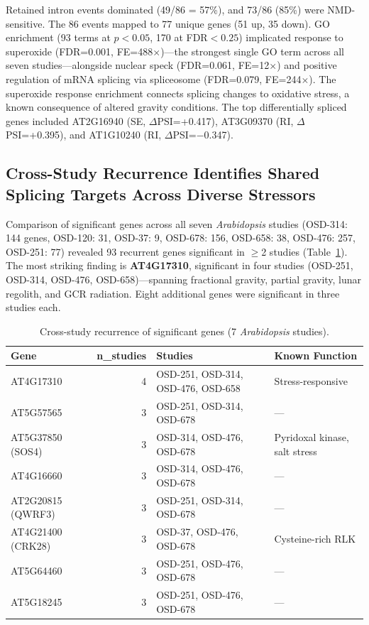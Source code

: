 \documentclass[12pt,a4paper]{article}
\begin{document}
Retained intron events dominated (49/86 = 57\%), and 73/86 (85\%) were NMD-sensitive. The 86 events mapped to 77 unique genes (51 up, 35 down). GO enrichment (93 terms at $p<0.05$, 170 at FDR$<0.25$) implicated response to superoxide (FDR=0.001, FE=488$\times$)---the strongest single GO term across all seven studies---alongside nuclear speck (FDR=0.061, FE=12$\times$) and positive regulation of mRNA splicing via spliceosome (FDR=0.079, FE=244$\times$). The superoxide response enrichment connects splicing changes to oxidative stress, a known consequence of altered gravity conditions. The top differentially spliced genes included AT2G16940 (SE, $\Delta$PSI=+0.417), AT3G09370 (RI, $\Delta$PSI=+0.395), and AT1G10240 (RI, $\Delta$PSI=$-$0.347).

\subsection{Cross-Study Recurrence Identifies Shared Splicing Targets Across Diverse Stressors}

Comparison of significant genes across all seven \textit{Arabidopsis} studies (OSD-314: 144 genes, OSD-120: 31, OSD-37: 9, OSD-678: 156, OSD-658: 38, OSD-476: 257, OSD-251: 77) revealed 93 recurrent genes significant in $\geq$2 studies (Table~\ref{tab:cross_study_recurrence}). The most striking finding is \textbf{AT4G17310}, significant in four studies (OSD-251, OSD-314, OSD-476, OSD-658)---spanning fractional gravity, partial gravity, lunar regolith, and GCR radiation. Eight additional genes were significant in three studies each.

\begin{table}[h]
\centering
\caption{Cross-study recurrence of significant genes (7 \textit{Arabidopsis} studies).}
\label{tab:cross_study_recurrence}
\begin{tabular}{lrll}
\toprule
\textbf{Gene} & \textbf{n\_studies} & \textbf{Studies} & \textbf{Known Function} \\
\midrule
AT4G17310 & 4 & OSD-251, OSD-314, OSD-476, OSD-658 & Stress-responsive \\
AT5G57565 & 3 & OSD-251, OSD-314, OSD-678 & --- \\
AT5G37850 (SOS4) & 3 & OSD-314, OSD-476, OSD-678 & Pyridoxal kinase, salt stress \\
AT4G16660 & 3 & OSD-314, OSD-476, OSD-678 & --- \\
AT2G20815 (QWRF3) & 3 & OSD-251, OSD-314, OSD-678 & --- \\
AT4G21400 (CRK28) & 3 & OSD-37, OSD-476, OSD-678 & Cysteine-rich RLK \\
AT5G64460 & 3 & OSD-251, OSD-476, OSD-678 & --- \\
AT5G18245 & 3 & OSD-251, OSD-476, OSD-678 & --- \\
\bottomrule
\end{tabular}
\end{table}
\end{document}
